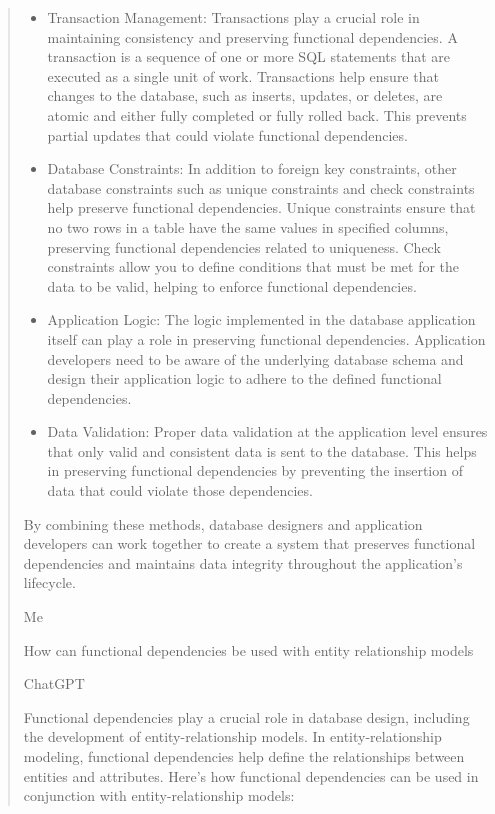 \documentclass[11pt]{article}
\begin{document}
\begin{enumerate}
\begin{quotation}
\begin{itemize}
 \item   Transaction Management:
        Transactions play a crucial role in maintaining consistency and preserving functional dependencies. A transaction is a sequence of one or more SQL statements that are executed as a single unit of work.
        Transactions help ensure that changes to the database, such as inserts, updates, or deletes, are atomic and either fully completed or fully rolled back. This prevents partial updates that could violate functional dependencies.

\item    Database Constraints:
        In addition to foreign key constraints, other database constraints such as unique constraints and check constraints help preserve functional dependencies.
        Unique constraints ensure that no two rows in a table have the same values in specified columns, preserving functional dependencies related to uniqueness.
        Check constraints allow you to define conditions that must be met for the data to be valid, helping to enforce functional dependencies.

\item    Application Logic:
        The logic implemented in the database application itself can play a role in preserving functional dependencies. Application developers need to be aware of the underlying database schema and design their application logic to adhere to the defined functional dependencies.

\item    Data Validation:
        Proper data validation at the application level ensures that only valid and consistent data is sent to the database. This helps in preserving functional dependencies by preventing the insertion of data that could violate those dependencies.
\end{itemize}
By combining these methods, database designers and application developers can work together to create a system that preserves functional dependencies and maintains data integrity throughout the application's lifecycle.

Me

How can functional dependencies be used with entity relationship models

ChatGPT

Functional dependencies play a crucial role in database design, including the development of entity-relationship models. In entity-relationship modeling, functional dependencies help define the relationships between entities and attributes. Here's how functional dependencies can be used in conjunction with entity-relationship models:


\end{quotation}
\end{enumerate}
\end{document}
